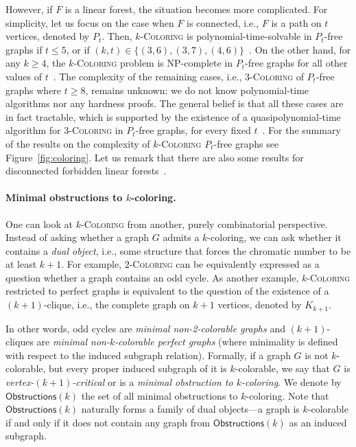 \documentclass[11pt,a4paper]{article}
\theoremstyle{mystyle}
\newcommand{\colo}[1]{\ensuremath{#1}-\textsc{Coloring}\xspace}
\newcommand{\NP}{\textsf{NP}}
\newcommand{\obs}[1]{\mathsf{Obstructions}(#1)}
\begin{document}
However, if $F$ is a linear forest, the situation becomes more complicated.
For simplicity, let us focus on the case when $F$ is connected, i.e., $F$ is a path on $t$ vertices, denoted by $P_t$.
Then, \colo{k} is polynomial-time-solvable in $P_t$-free graphs if $t \leq 5$, or if $(k,t) \in \{(3,6),(3,7),(4,6)\}$~\cite{DBLP:journals/ejc/Huang16,DBLP:conf/soda/SpirklCZ19,DBLP:journals/combinatorica/BonomoCMSSZ18,DBLP:journals/algorithmica/HoangKLSS10}. 
On the other hand, for any $k \geq 4$, the \colo{k} problem is \NP-complete in $P_t$-free graphs for all other values of $t$~\cite{DBLP:journals/ejc/Huang16}.
The complexity of the remaining cases, i.e., \colo{3} of $P_t$-free graphs where $t \geq 8$, remains unknown:
we do not know polynomial-time algorithms nor any hardness proofs.
The general belief is that all these cases are in fact tractable, which is supported by the existence of a quasipolynomial-time algorithm for \colo{3} in $P_t$-free graphs, for every fixed $t$~\cite{DBLP:conf/sosa/PilipczukPR21}. For the summary of the results on the complexity of \colo{k} $P_t$-free graphs see Figure~\ref{fig:coloring}. 
Let us remark that there are also some results for disconnected forbidden linear forests~\cite{DBLP:journals/algorithmica/KlimosovaMMNPS20,DBLP:journals/algorithmica/ChudnovskyHSZ21}.


\paragraph{Minimal obstructions to $k$-coloring.} 
One can look at \colo{k} from another, purely combinatorial perspective.
Instead of asking whether a graph $G$ admits a $k$-coloring, we can ask whether it contains a \emph{dual object}, i.e., some structure that forces the chromatic number to be at least $k+1$.
For example, \colo{2} can be equivalently expressed as a question whether a graph contains an odd cycle.
As another example, \colo{k} restricted to perfect graphs is equivalent to the question of the existence of a $(k+1)$-clique, i.e., the complete graph on $k+1$ vertices, denoted by $K_{k+1}$.

In other words, odd cycles are \emph{minimal non-2-colorable graphs} and $(k+1)$-cliques are \emph{minimal non-$k$-colorable perfect graphs} (where minimality is defined with respect to the induced subgraph relation).
Formally, if a graph $G$ is not $k$-colorable, but every proper induced subgraph of it is $k$-colorable, we say that $G$ is \emph{vertex-$(k+1)$-critical} or is a \emph{minimal obstruction to $k$-coloring}.
We denote by $\obs{k}$ the set of all minimal obstructions to $k$-coloring.
Note that $\obs{k}$ naturally forms a family of dual objects---a graph is $k$-colorable if and only if it does not contain any graph from $\obs{k}$ as an induced subgraph.
\end{document}
